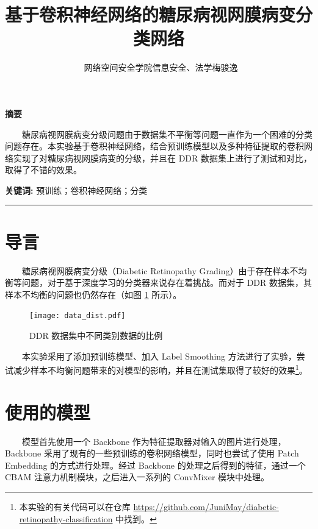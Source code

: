 \documentclass[twocolumn, fontsize=10pt]{article}
\title{
\Large 基于卷积神经网络的糖尿病视网膜病变分类网络\\ \vspace{0.5em}
}
\date{}
\author{\, 网络空间安全学院\quad 信息安全、法学\quad 2111876\quad 梅骏逸}
\makeatletter
\renewenvironment{abstract} %
 {\small
  \begin{center}
  \bfseries 摘要\vspace{-.5em}\vspace{0pt}
  \end{center}
  \list{}{%
    \setlength{\leftmargin}{0mm}
    \setlength{\rightmargin}{\leftmargin}%
  }
  \item\relax}
 {\endlist}
\renewcommand{\maketitle}{\bgroup\setlength{\parindent}{0pt} %
\begin{flushleft}
  \textbf{\@title}
  \@author \\ 
  \@date
\end{flushleft}\egroup
}
\makeatother
\begin{document}
\twocolumn[ \maketitle ]

\begin{abstract}
    　　糖尿病视网膜病变分级问题由于数据集不平衡等问题一直作为一个困难的分类问题存在。本实验基于卷积神经网络，结合预训练模型以及多种特征提取的卷积网络实现了对糖尿病视网膜病变的分级，并且在 DDR 数据集上进行了测试和对比，取得了不错的效果。
\end{abstract}

{\small\textbf{关键词:} 预训练；卷积神经网络；分类}

\rule{\linewidth}{0.7pt}

\tableofcontents

\section{导言}
　　糖尿病视网膜病变分级（Diabetic Retinopathy Grading）由于存在样本不均衡等问题，对于基于深度学习的分类器来说存在着挑战。而对于 DDR 数据集\cite{LI2019}，其样本不均衡的问题也仍然存在（如图 \ref{fig:data_dist} 所示）。

\begin{figure}
    \centering
    \texttt{[image: data\_dist.pdf]}
    \caption{DDR 数据集中不同类别数据的比例}
    \label{fig:data_dist}
\end{figure}

　　本实验采用了添加预训练模型、加入 Label Smoothing 方法进行了实验，尝试减少样本不均衡问题带来的对模型的影响，并且在测试集取得了较好的效果\footnote{本实验的有关代码可以在仓库 \url{https://github.com/JuniMay/diabetic-retinopathy-classification} 中找到。}。

\section{使用的模型}

　　模型首先使用一个 Backbone 作为特征提取器对输入的图片进行处理，Backbone 采用了现有的一些预训练的卷积网络模型，同时也尝试了使用 Patch Embedding 的方式进行处理。经过 Backbone 的处理之后得到的特征，通过一个 CBAM \cite{woo2018}注意力机制模块，之后进入一系列的 ConvMixer 模块中处理。
\end{document}
